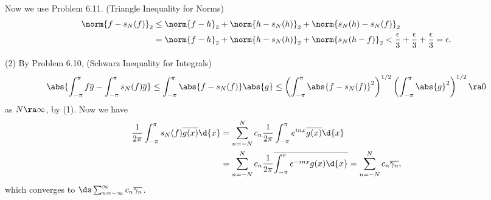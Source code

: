 Now we use {\sffamily Problem 6.11}. (Triangle Inequality for Norms)
\[
    \begin{aligned}
        \norm{f - s_N(f)}_2 & \leq \norm{f - h}_2 + \norm{h - s_N(h)}_2 + \norm{s_N(h) - s_N(f)}_2                                                                    \\
                            & = \norm{f - h}_2 + \norm{h - s_N(h)}_2 + \norm{s_N(h - f)}_2 < \frac{\epsilon}{3} + \frac{\epsilon}{3} + \frac{\epsilon}{3} = \epsilon.
    \end{aligned}
\]

(2) By {\sffamily Problem 6.10}, (Schwarz Inequality for Integrals)
\[
    \abs{\int_{-\pi}^\pi f \overline{g} - \int_{-\pi}^\pi s_N(f) \overline{g}} \leq \int_{-\pi}^\pi \abs{f - s_N(f)}\abs{g} \leq \left(\int_{-\pi}^\pi \abs{f - s_N(f)}^2\right)^{1/2} \left(\int_{-\pi}^\pi \abs{g}^2\right)^{1/2} \ra 0
\]
as \(N \ra \infty\), by (1). Now we have
\[
    \begin{aligned}
        \frac{1}{2\pi} \int_{-\pi}^\pi s_N(f) \overline{g(x)}\d{x} & = \sum_{n = -N}^N c_n \frac{1}{2\pi} \int_{-\pi}^\pi e^{inx} \overline{g(x)}\d{x}                                            \\
                                                                   & =\sum_{n = -N}^N c_n \frac{1}{2\pi} \overline{\int_{-\pi}^\pi e^{-inx} g(x)\d{x}} = \sum_{n = -N}^N c_n \overline{\gamma_n},
    \end{aligned}
\]
which converges to \(\ds \sum_{n=-\infty}^\infty c_n \overline{\gamma_n}\).

\pagebreak
